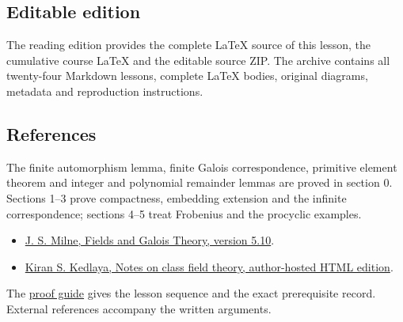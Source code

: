 \documentclass[11pt,a4paper]{article}
\newcommand{\tightlist}{\setlength{\itemsep}{0pt}\setlength{\parskip}{0pt}}
\begin{document}
\subsection{Editable edition}\label{editable-edition}

The reading edition provides the complete LaTeX source of this lesson,
the cumulative course LaTeX and the editable source ZIP. The archive
contains all twenty-four Markdown lessons, complete LaTeX bodies,
original diagrams, metadata and reproduction instructions.

\subsection{References}\label{references}

The finite automorphism lemma, finite Galois correspondence, primitive
element theorem and integer and polynomial remainder lemmas are proved
in section 0. Sections 1--3 prove compactness, embedding extension and
the infinite correspondence; sections 4--5 treat Frobenius and the
procyclic examples.

\begin{itemize}
\tightlist
\item
  \href{https://www.jmilne.org/math/CourseNotes/FT.pdf}{J. S. Milne,
  Fields and Galois Theory, version 5.10}.
\item
  \href{https://kskedlaya.org/cft/sec_abstractcft1.html}{Kiran S.
  Kedlaya, Notes on class field theory, author-hosted HTML edition}.
\end{itemize}

The \href{../free-proofs.html}{proof guide} gives the lesson sequence
and the exact prerequisite record. External references accompany the
written arguments.
\end{document}
